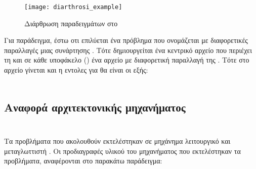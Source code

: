 \begin{center}
\begin{figure}[h]
\centering
\texttt{[image: diarthrosi\_example]}
\captionsetup{justification=centering, singlelinecheck=false}
\caption{Διάρθρωση παραδειγμάτων στο \href{https://github.com/gkonto/openmp/}{\emph{}}}
\label{fig:diarthrosi_example}
\end{figure}
\end{center}

Για παράδειγμα, έστω οτι επιλύεται ένα πρόβλημα που ονομάζεται \emph{} με διαφορετικές παραλλαγές μιας
συνάρτησης \emph{}. Τότε δημιουργείται ένα κεντρικό αρχείο \emph{} που περιέχει τη
\emph{} και σε κάθε υποφάκελο (\emph{}) ένα αρχείο \emph{} με διαφορετική παραλλαγή
της \emph{}. Τότε στο αρχείο  γίνεται \emph{} και η εντολες για
\emph{} θα είναι οι εξής:\\
\\
\clearpage
\subsection{Αναφορά αρχιτεκτονικής μηχανήματος}
\subparagraph{}
\ \\
Τα προβλήματα που ακολουθούν εκτελέστηκαν σε μηχάνημα λειτουργικό \emph{} και μεταγλωττιστή
\emph{}. Οι προδιαγραφές υλικού του μηχανήματος που εκτελέστηκαν τα προβλήματα, αναφέρονται στο παρακάτω
παράδειγμα:

